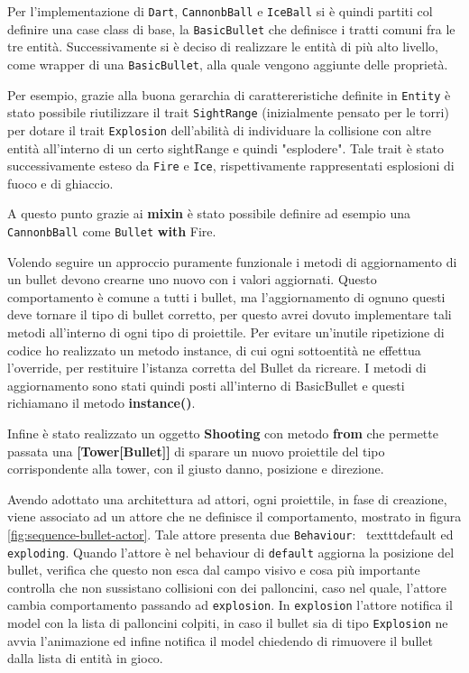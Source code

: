 Per l'implementazione di \texttt{Dart}, \texttt{CannonbBall} e \texttt{IceBall} si è quindi partiti col definire una case class
di base, la \texttt{BasicBullet} che definisce i tratti comuni fra le tre entità. Successivamente si è deciso di realizzare
le entità di più alto livello, come wrapper di una \texttt{BasicBullet}, alla quale vengono aggiunte delle proprietà.

Per esempio, grazie alla buona gerarchia di carattereristiche definite in \texttt{Entity} è stato possibile riutilizzare
il trait \texttt{SightRange} (inizialmente pensato per le torri) per dotare il trait \texttt{Explosion} dell'abilità di
individuare la collisione con altre entità all'interno di un certo sightRange e quindi "esplodere". Tale trait è stato
successivamente esteso da \texttt{Fire} e \texttt{Ice}, rispettivamente rappresentati esplosioni di fuoco e di ghiaccio.

A questo punto grazie ai \textbf{mixin} è stato possibile definire ad esempio una \texttt{CannonbBall} come
\texttt{Bullet} \textbf{with} Fire.

Volendo seguire un approccio puramente funzionale i metodi di aggiornamento di un bullet devono crearne uno nuovo
con i valori aggiornati. Questo comportamento è comune a tutti i bullet, ma l'aggiornamento
di ognuno questi deve tornare il tipo di bullet corretto, per questo avrei dovuto implementare tali
metodi all'interno di ogni tipo di proiettile. Per evitare un'inutile ripetizione
di codice ho realizzato un metodo instance, di cui ogni sottoentità ne effettua l'override, per restituire l'istanza
corretta del Bullet da ricreare. I metodi di aggiornamento sono stati quindi posti all'interno di BasicBullet e questi
richiamano il metodo \textbf{instance()}.

Infine è stato realizzato un oggetto \textbf{Shooting} con metodo \textbf{from} che permette passata una \textbf{[Tower[Bullet]]}
di sparare un nuovo proiettile del tipo corrispondente alla tower, con il giusto danno, posizione e direzione.



Avendo adottato una architettura ad attori, ogni proiettile, in fase di creazione, viene associato ad un attore che ne definisce
il comportamento, mostrato in figura \ref{fig:sequence-bullet-actor}. Tale attore presenta due \texttt{Behaviour}: \
texttt{default} ed \texttt{exploding}.
Quando l'attore è nel behaviour di \texttt{default} aggiorna la posizione del bullet, verifica che questo non esca dal campo visivo e
cosa più importante controlla che non sussistano collisioni con dei palloncini, caso nel quale, l'attore cambia comportamento
passando ad \texttt{explosion}.
In \texttt{explosion} l'attore notifica il model con la lista di palloncini colpiti, in caso il bullet sia di tipo
\texttt{Explosion} ne avvia l'animazione ed infine notifica il model chiedendo di rimuovere il bullet dalla lista di entità
in gioco.


